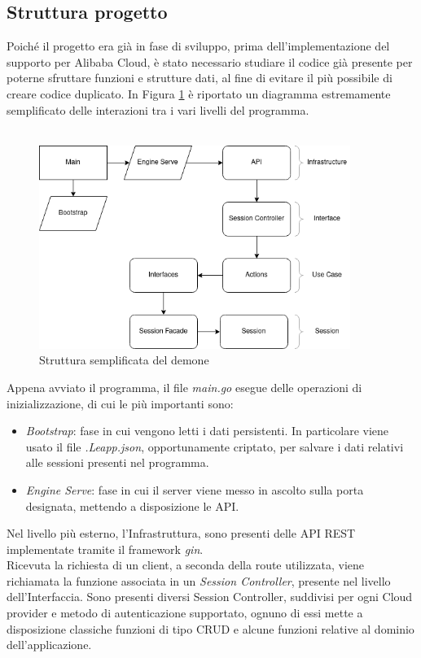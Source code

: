 \documentclass[a4paper]{article}
\begin{document}
\subsection{Struttura progetto}
Poiché il progetto era già in fase di sviluppo, prima dell'implementazione del supporto per Alibaba Cloud, è stato necessario studiare il codice già presente per poterne sfruttare funzioni e strutture dati, al fine di evitare il più possibile di creare codice duplicato. In Figura \ref{fig:strut} è riportato un diagramma estremamente semplificato delle interazioni tra i vari livelli del programma.\\\\
\begin{figure}[ht]
    \centering
    \includegraphics[width=0.9\textwidth]{Risorse/PianoForge.png}
    \caption{Struttura semplificata del demone}
    \label{fig:strut}
\end{figure}
Appena avviato il programma, il file \textit{main.go} esegue delle operazioni di inizializzazione, di cui le più importanti sono:
\begin{itemize}
    \item \textit{Bootstrap}: fase in cui vengono letti i dati persistenti. In particolare viene usato il file \textit{.Leapp.json}, opportunamente criptato, per salvare i dati relativi alle sessioni presenti nel programma.
    \item \textit{Engine Serve}: fase in cui il server viene messo in ascolto sulla porta designata, mettendo a disposizione le API.
\end{itemize}
Nel livello più esterno, l'Infrastruttura, sono presenti delle API REST implementate tramite il framework \textit{gin}\cite{gin}. \\
Ricevuta la richiesta di un client, a seconda della route utilizzata, viene richiamata la funzione associata in un \textit{Session Controller}, presente nel livello dell'Interfaccia. Sono presenti diversi Session Controller, suddivisi per ogni Cloud provider e metodo di autenticazione supportato, ognuno di essi mette a disposizione classiche funzioni di tipo CRUD\cite{crud} e alcune funzioni relative al dominio dell'applicazione.\\
\end{document}
